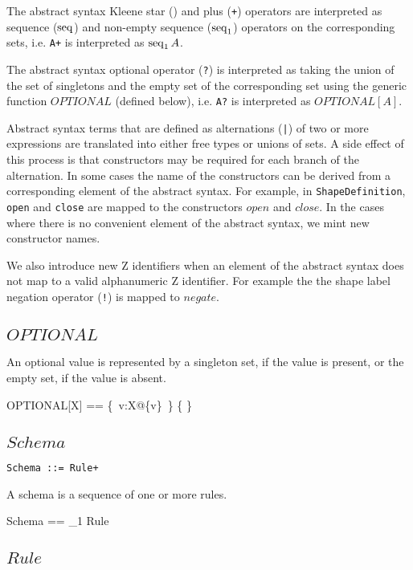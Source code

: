 \documentclass{article}
\begin{document}
The abstract syntax Kleene star ({\tt *}) and plus ({\tt +}) operators are interpreted as sequence ($\mathop{\mathrm{seq}}$) 
and non-empty sequence ($\mathop{\mathrm{seq}}_1$) operators on the corresponding sets, i.e.
{\tt A+} is interpreted as $\mathop{\mathrm{seq}}_1 A$.

The abstract syntax optional operator ({\tt ?}) is interpreted as taking the union of the set of singletons and the 
empty set of the corresponding set
using the generic function $OPTIONAL$ (defined below), i.e.
{\tt A?} is interpreted as $OPTIONAL[A]$.

Abstract syntax terms that are defined as alternations ({\tt |}) of two or more expressions are translated into either free types or unions
of sets.
A side effect of this process is that constructors may be required for each branch of the alternation.
In some cases the name of the constructors can be derived from a corresponding element of the abstract syntax.
For example, in {\tt ShapeDefinition}, {\tt open} and {\tt close} are mapped to the constructors $open$ and $close$.
In the cases where there is no convenient element of the abstract syntax, we mint new constructor names.

We also introduce new Z identifiers when an element of the abstract syntax does not map to a valid alphanumeric Z identifier.
For example the the shape label negation operator ({\tt !}) is mapped to $negate$.

\subsection{$OPTIONAL$}
An optional value is represented by a singleton set, if the value is present, or the empty set, if the value is absent.
\begin{zed}
	OPTIONAL[X] == \{~v:X@\{v\}~\} \cup \{ \emptyset \}
\end{zed}

\subsection{$Schema$}

\begin{verbatim}
Schema ::= Rule+
\end{verbatim}

A schema is a sequence of one or more rules.
\begin{zed}
	Schema == \seq_1 Rule
\end{zed}

\subsection{$Rule$}
\end{document}
